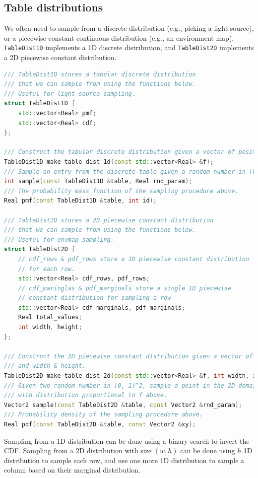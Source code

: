 \documentclass{article}
\begin{document}
\subsection{Table distributions}
We often need to sample from a discrete distribution (e.g., picking a light source), or a piecewise-constant continuous distribution (e.g., an environment map).
\lstinline{TableDist1D} implements a 1D discrete distribution, and \lstinline{TableDist2D} implements a 2D piecewise constant distribution.
\begin{lstlisting}[language=c++]
/// TableDist1D stores a tabular discrete distribution
/// that we can sample from using the functions below.
/// Useful for light source sampling.
struct TableDist1D {
    std::vector<Real> pmf;
    std::vector<Real> cdf;
};

/// Construct the tabular discrete distribution given a vector of positive numbers.
TableDist1D make_table_dist_1d(const std::vector<Real> &f);
/// Sample an entry from the discrete table given a random number in [0, 1]
int sample(const TableDist1D &table, Real rnd_param);
/// The probability mass function of the sampling procedure above.
Real pmf(const TableDist1D &table, int id);

/// TableDist2D stores a 2D piecewise constant distribution
/// that we can sample from using the functions below.
/// Useful for envmap sampling.
struct TableDist2D {
    // cdf_rows & pdf_rows store a 1D piecewise constant distribution
    // for each row.
    std::vector<Real> cdf_rows, pdf_rows;
    // cdf_maringlas & pdf_marginals store a single 1D piecewise
    // constant distribution for sampling a row
    std::vector<Real> cdf_marginals, pdf_marginals;
    Real total_values;
    int width, height;
};

/// Construct the 2D piecewise constant distribution given a vector of positive numbers
/// and width & height.
TableDist2D make_table_dist_2d(const std::vector<Real> &f, int width, int height);
/// Given two random number in [0, 1]^2, sample a point in the 2D domain [0, 1]^2
/// with distribution proportional to f above.
Vector2 sample(const TableDist2D &table, const Vector2 &rnd_param);
/// Probability density of the sampling procedure above.
Real pdf(const TableDist2D &table, const Vector2 &xy);
\end{lstlisting}

Sampling from a 1D distribution can be done using a binary search to invert the CDF. Sampling
from a 2D distribution with size $(w, h)$ can be done using $h$ 1D distribution to sample each row,
and use one more 1D distribution to sample a column based on their marginal distribution.
\end{document}
